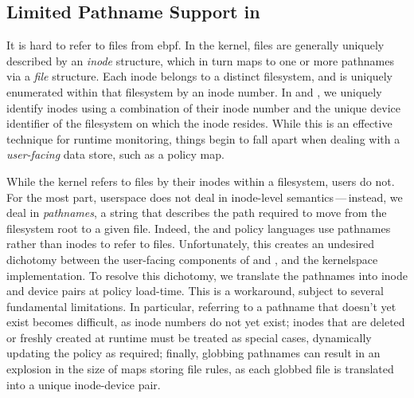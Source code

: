 \subsection{Limited Pathname Support in }


It is hard to refer to files from \gls{ebpf}. In the kernel, files are generally uniquely
described by an \textit{inode} structure, which in turn maps to one or more pathnames via
a \textit{file} structure. Each inode belongs to a distinct filesystem, and is uniquely
enumerated within that filesystem by an inode number.  In \bpfbox{} and \bpfcontain{}, we
uniquely identify inodes using a combination of their inode number and the unique device
identifier of the filesystem on which the inode resides. While this is an effective
technique for runtime monitoring, things begin to fall apart when dealing with
a \textit{user-facing} data store, such as a policy map.

While the kernel refers to files by their inodes within a filesystem, users do not. For
the most part, userspace does not deal in inode-level semantics\,---\,instead, we deal in
\textit{pathnames}, a string that describes the path required to move from the filesystem
root to a given file. Indeed, the \bpfbox{} and \bpfcontain{} policy languages use
pathnames rather than inodes to refer to files. Unfortunately, this creates an undesired
dichotomy between the user-facing components of \bpfbox{} and \bpfcontain{}, and the
kernelspace implementation.  To resolve this dichotomy, we translate the pathnames into
inode and device pairs at policy load-time. This is a workaround, subject to several
fundamental limitations. In particular, referring to a pathname that doesn't yet exist
becomes difficult, as inode numbers do not yet exist; inodes that are deleted or freshly
created at runtime must be treated as special cases, dynamically updating the policy as
required; finally, globbing pathnames can result in an explosion in the size of maps
storing file rules, as each globbed file is translated into a unique inode-device pair.

